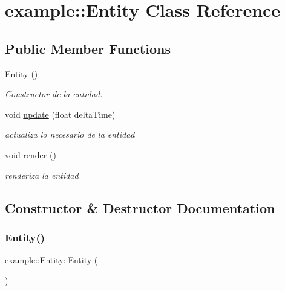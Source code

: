 \hypertarget{classexample_1_1_entity}{}\section{example\+::Entity Class Reference}
\label{classexample_1_1_entity}
\subsection*{Public Member Functions}
\begin{DoxyCompactItemize}
\item 
\mbox{\hyperlink{classexample_1_1_entity_a4860e443762ca383ffb4bf82626c7b3e}{Entity}} ()
\begin{DoxyCompactList}\small\item\em Constructor de la entidad. \end{DoxyCompactList}\item 
void \mbox{\hyperlink{classexample_1_1_entity_a44bb0b33997980cdb895500e53e1ce6a}{update}} (float delta\+Time)
\begin{DoxyCompactList}\small\item\em actualiza lo necesario de la entidad \end{DoxyCompactList}\item 
void \mbox{\hyperlink{classexample_1_1_entity_a77e00e7676f787a08345c12f4144b2a5}{render}} ()
\begin{DoxyCompactList}\small\item\em renderiza la entidad \end{DoxyCompactList}\end{DoxyCompactItemize}


\subsection{Constructor \& Destructor Documentation}
\mbox{\label{classexample_1_1_entity_a4860e443762ca383ffb4bf82626c7b3e}} 
\subsubsection{\texorpdfstring{Entity()}{Entity()}}
{\footnotesize\ttfamily example\+::\+Entity\+::\+Entity (\begin{DoxyParamCaption}{ }\end{DoxyParamCaption})}



